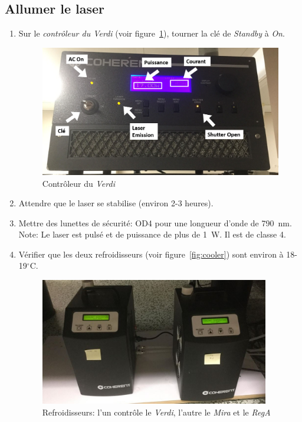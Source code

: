 \subsection{Allumer le laser}
\begin{enumerate}
    \item \label{etape1} Sur le \textit{contrôleur du Verdi} (voir figure~\ref{fig:controleur-verdi}), tourner la clé de \textit{Standby} à \textit{On}.
        \begin{figure}[H]
        \centering
        \includegraphics[width=12cm]{controleur-verdi.png}
        \caption{Contrôleur du \textit{Verdi}}
        \label{fig:controleur-verdi}
        \end{figure}
    \item Attendre que le laser se stabilise (environ 2-3 heures).
    \item Mettre des lunettes de sécurité: OD4 pour une longueur d'onde de 790~nm. 
    \\ Note: Le laser est pulsé et de puissance de plus de 1~W. Il est de classe 4.
    \item Vérifier que les deux refroidisseurs (voir figure~\ref{fig:cooler}) sont environ à 18-19$^\circ$C.
        \begin{figure}[H]
        \centering
        \includegraphics[width=10cm]{cooler.jpg}
        \caption{Refroidisseurs: l'un contrôle le \textit{Verdi}, l'autre le \textit{Mira} et le \textit{RegA}}

\end{figure}
\end{enumerate}
